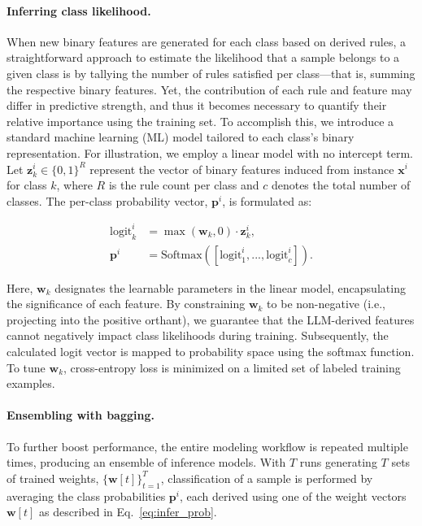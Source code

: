 \vspace*{-0.12in}
\paragraph{Inferring class likelihood.} When new binary features are generated for each class based on derived rules, a straightforward approach to estimate the likelihood that a sample belongs to a given class is by tallying the number of rules satisfied per class—that is, summing the respective binary features. Yet, the contribution of each rule and feature may differ in predictive strength, and thus it becomes necessary to quantify their relative importance using the training set. To accomplish this, we introduce a standard machine learning (ML) model tailored to each class’s binary representation. For illustration, we employ a linear model with no intercept term. Let $\mathbf{z}_k^i \in \{0, 1\}^R$ represent the vector of binary features induced from instance $\mathbf{x}^i$ for class $k$, where $R$ is the rule count per class and $c$ denotes the total number of classes. The per-class probability vector, $\mathbf{p}^i$, is formulated as:

\begin{align}
\text{logit}_k^i &= \max(\mathbf{w}_k, 0) \cdot \mathbf{z}_k^i, \nonumber \\
\mathbf{p}^i &= \text{Softmax}({[\text{logit}_{1}^i, ..., \text{logit}_{c}^i]}). \label{eq:infer_prob}
\end{align}

Here, $\mathbf{w}_k$ designates the learnable parameters in the linear model, encapsulating the significance of each feature. By constraining $\mathbf{w}_k$ to be non-negative (i.e., projecting into the positive orthant), we guarantee that the LLM-derived features cannot negatively impact class likelihoods during training. Subsequently, the calculated logit vector is mapped to probability space using the softmax function. To tune $\mathbf{w}_k$, cross-entropy loss is minimized on a limited set of labeled training examples.

\vspace*{-0.12in}
\paragraph{Ensembling with bagging.} To further boost performance, the entire modeling workflow is repeated multiple times, producing an ensemble of inference models. With $T$ runs generating $T$ sets of trained weights, $\{\mathbf{w}[t]\}_{t=1}^T$, classification of a sample is performed by averaging the class probabilities $\mathbf{p}^i$, each derived using one of the weight vectors $\mathbf{w}[t]$ as described in Eq.~\ref{eq:infer_prob}.

